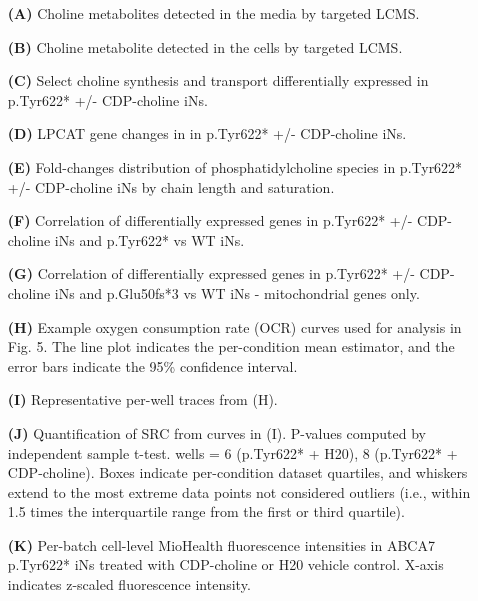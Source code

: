 \begin{itemize}
    \item[\textbf{(A)}] Choline metabolites detected in the media by targeted LCMS.
    \item[\textbf{(B)}] Choline metabolite detected in the cells by targeted LCMS.
    \item[\textbf{(C)}] Select choline synthesis and transport differentially expressed in p.Tyr622* +/- CDP-choline iNs.
    \item[\textbf{(D)}] LPCAT gene changes in in p.Tyr622* +/- CDP-choline iNs.
    \item[\textbf{(E)}] Fold-changes distribution of phosphatidylcholine species in p.Tyr622* +/- CDP-choline iNs by chain length and saturation.
    \item[\textbf{(F)}] Correlation of differentially expressed genes in p.Tyr622* +/- CDP-choline iNs and p.Tyr622* vs WT iNs.
    \item[\textbf{(G)}] Correlation of differentially expressed genes in p.Tyr622* +/- CDP-choline iNs and p.Glu50fs*3 vs WT iNs - mitochondrial genes only.
    \item[\textbf{(H)}] Example oxygen consumption rate (OCR) curves used for analysis in Fig. 5. The line plot indicates the per-condition mean estimator, and the error bars indicate the 95\% confidence interval. 
    \item[\textbf{(I)}] Representative per-well traces from (H).
    \item[\textbf{(J)}] Quantification of SRC from curves in (I). P-values computed by independent sample t-test.  wells = 6 (p.Tyr622* + H20), 8 (p.Tyr622* + CDP-choline). Boxes indicate per-condition dataset quartiles, and whiskers extend to the most extreme data points not considered outliers (i.e., within 1.5 times the interquartile range from the first or third quartile). 
    \item[\textbf{(K)}] Per-batch cell-level MioHealth fluorescence intensities in ABCA7 p.Tyr622* iNs treated with CDP-choline or H20 vehicle control. X-axis indicates z-scaled fluorescence intensity.
\end{itemize}